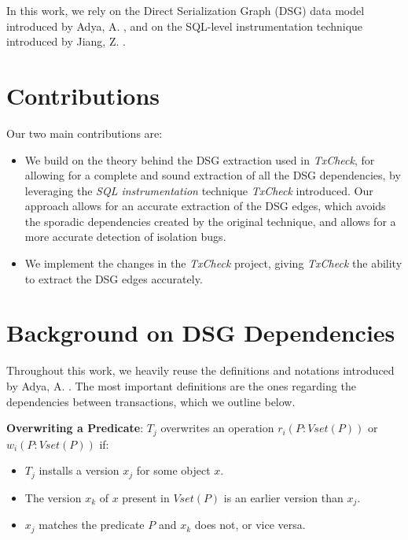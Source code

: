 In this work, we rely on the Direct Serialization Graph (DSG) data model introduced by Adya, A. \cite{adya1999weak}, and on the SQL-level instrumentation technique introduced by Jiang, Z. \cite{jiang2023detecting}.

\section{Contributions}

Our two main contributions are:

\begin{itemize}
    \item We build on the theory behind the DSG extraction used in \textit{TxCheck}, for allowing for a complete and sound extraction of all the DSG dependencies, by leveraging the \textit{SQL instrumentation} technique \textit{TxCheck} introduced. Our approach allows for an accurate extraction of the DSG edges, which avoids the sporadic dependencies created by the original technique, and allows for a more accurate detection of isolation bugs.
    \item We implement the changes in the \textit{TxCheck} project, giving \textit{TxCheck} the ability to extract the DSG edges accurately.
\end{itemize}


\section{Background on DSG Dependencies}

Throughout this work, we heavily reuse the definitions and notations introduced by Adya, A. \cite{adya1999weak}. The most important definitions are the ones regarding the dependencies between transactions, which we outline below.

\begin{definition}
    \label{def:overwriting}
    \textbf{Overwriting a Predicate}: $T_j$ overwrites an operation $r_i(P: Vset(P))$ or $w_i(P: Vset(P))$ if:
    \begin{itemize}
        \item $T_j$ installs a version $x_j$ for some object $x$.
        \item The version $x_k$ of $x$ present in $Vset(P)$ is an earlier version than $x_j$.
        \item $x_j$ matches the predicate $P$ and $x_k$ does not, or vice versa.
    \end{itemize}  
\end{definition}

